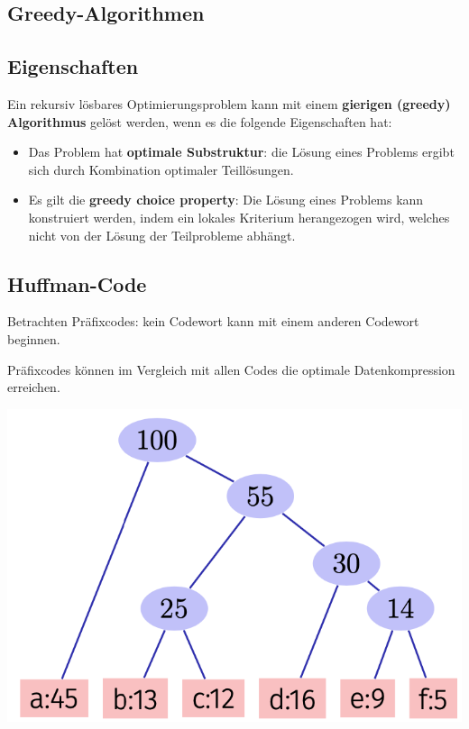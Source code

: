 \begin{sectionbox}
\section{Greedy-Algorithmen}
\subsection{Eigenschaften}
Ein rekursiv lösbares Optimierungsproblem kann mit einem \textbf{gierigen (greedy) Algorithmus} gelöst werden, wenn es die folgende Eigenschaften hat:
\begin{itemize}
    \item Das Problem hat \textbf{optimale Substruktur}: die Lösung eines Problems ergibt sich durch Kombination optimaler Teillösungen.
    \item Es gilt die \textbf{greedy choice property}: Die Lösung eines Problems kann konstruiert werden, indem ein lokales Kriterium herangezogen wird, welches nicht von der Lösung der Teilprobleme abhängt.    
\end{itemize}
\end{sectionbox}
\vspace{-4pt}
\begin{sectionbox}
\subsection{Huffman-Code} 
Betrachten Präfixcodes: kein Codewort kann mit einem anderen Codewort beginnen.\par
Präfixcodes können im Vergleich mit allen Codes die optimale Datenkompression erreichen.\par\smallskip
\begin{center}
    \includegraphics[width=0.35 \columnwidth]{img/HuffmanImg.png}
\end{center}\par\smallskip
\end{sectionbox}
\vspace{-4pt}
